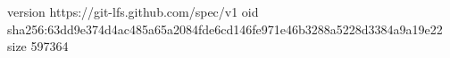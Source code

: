 version https://git-lfs.github.com/spec/v1
oid sha256:63dd9e374d4ac485a65a2084fde6cd146fe971e46b3288a5228d3384a9a19e22
size 597364

